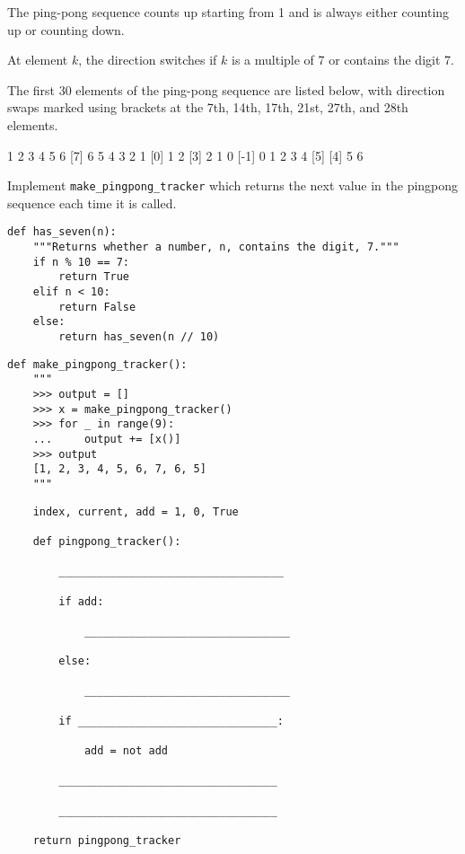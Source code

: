 \begin{blocksection}
\question The ping-pong sequence counts up starting from 1 and is always either counting up or counting down.

At element $k$, the direction switches if $k$ is a multiple of 7 or contains the digit 7.

The first 30 elements of the ping-pong sequence are listed below, with direction swaps marked using brackets at the 7th, 14th, 17th, 21st, 27th, and 28th elements.

\begin{verbnobox}[\sffamily]
1 2 3 4 5 6 [7] 6 5 4 3 2 1 [0] 1 2 [3] 2 1 0 [-1] 0 1 2 3 4 [5] [4] 5 6
\end{verbnobox}

Implement \lstinline$make_pingpong_tracker$ which returns the next value in the pingpong sequence each time it is called.

\begin{lstlisting}
def has_seven(n):
    """Returns whether a number, n, contains the digit, 7."""
    if n % 10 == 7:
        return True
    elif n < 10:
        return False
    else:
        return has_seven(n // 10)
\end{lstlisting}
\end{blocksection}
\begin{blocksection}
\begin{lstlisting}
def make_pingpong_tracker():
    """
    >>> output = []
    >>> x = make_pingpong_tracker()
    >>> for _ in range(9):
    ...     output += [x()]
    >>> output
    [1, 2, 3, 4, 5, 6, 7, 6, 5]
    """
\end{lstlisting}

\ifprintanswers\else
\begin{lstlisting}
    index, current, add = 1, 0, True

    def pingpong_tracker():

        ___________________________________

        if add:

            ________________________________

        else:

            ________________________________

        if _______________________________:

            add = not add

        __________________________________

        __________________________________

    return pingpong_tracker
\end{lstlisting}
\fi
\end{blocksection}
